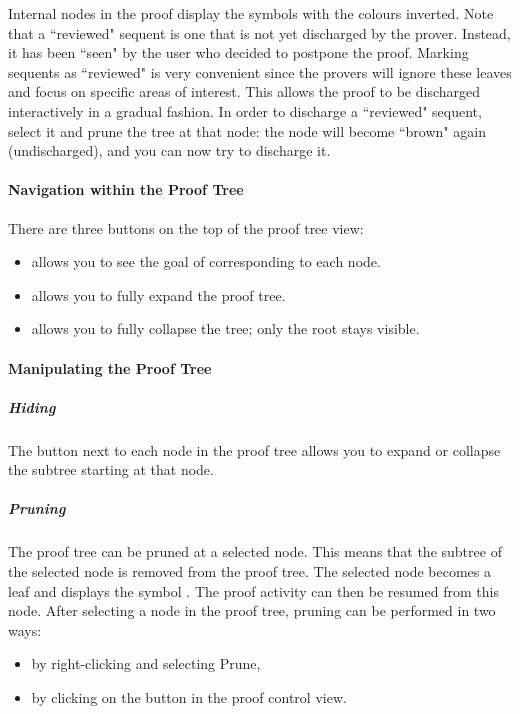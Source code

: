 Internal nodes in the proof display the symbols with the colours inverted. Note that a ``reviewed" sequent is one that is not yet discharged by the prover. Instead, it has been ``seen" by the user who decided to postpone the proof. Marking sequents as ``reviewed" is very convenient since the provers will ignore these leaves and focus on specific areas of interest. This allows the proof to be discharged interactively in a gradual fashion. In order to discharge a ``reviewed" sequent, select it and prune the tree at that node: the node will become ``brown" again (undischarged), and you can now try to discharge it. 

\paragraph{Navigation within the Proof Tree}

There are three buttons on the top of the proof tree view:

\begin{itemize}
	\item {} allows you to see the goal of corresponding to each node.
	\item {} allows you to fully expand the proof tree.
	\item {} allows you to fully collapse the tree; only the root stays visible. 
\end{itemize}

\paragraph{Manipulating the Proof Tree}

\subparagraph{Hiding}

The button next to each node in the proof tree allows you to expand or collapse the subtree starting at that node. 

\subparagraph{Pruning}

The proof tree can be pruned at a selected node. This means that the subtree of the selected node is removed from the proof tree. The selected node becomes a leaf and displays the symbol . The proof activity can then be resumed from this node. After selecting a node in the proof tree, pruning can be performed in two ways:

\begin{itemize}
	\item by right-clicking and selecting \textsf{Prune},
	\item by clicking on the  button in the proof control view. 
\end{itemize}

